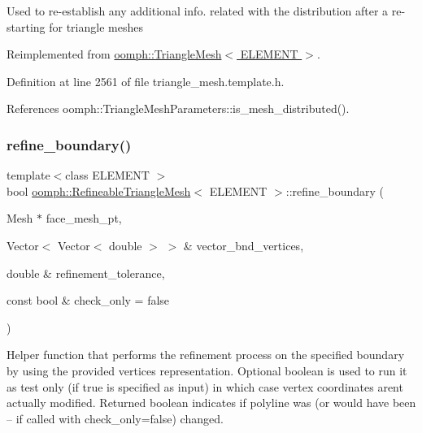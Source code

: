 Used to re-\/establish any additional info. related with the distribution after a re-\/starting for triangle meshes 

Reimplemented from \hyperlink{classoomph_1_1TriangleMesh_aa4b1cfd4537c1e511fe1f2fb14b1e8a6}{oomph\+::\+Triangle\+Mesh$<$ E\+L\+E\+M\+E\+N\+T $>$}.



Definition at line 2561 of file triangle\+\_\+mesh.\+template.\+h.



References oomph\+::\+Triangle\+Mesh\+Parameters\+::is\+\_\+mesh\+\_\+distributed().

\mbox{\label{classoomph_1_1RefineableTriangleMesh_a9bd4d46e9a61131b8b8f2b68579ac972}} 
\subsubsection{\texorpdfstring{refine\+\_\+boundary()}{refine\_boundary()}}
{\footnotesize\ttfamily template$<$class E\+L\+E\+M\+E\+NT $>$ \\
bool \hyperlink{classoomph_1_1RefineableTriangleMesh}{oomph\+::\+Refineable\+Triangle\+Mesh}$<$ E\+L\+E\+M\+E\+NT $>$\+::refine\+\_\+boundary (\begin{DoxyParamCaption}\item[{Mesh $\ast$}]{face\+\_\+mesh\+\_\+pt,  }\item[{Vector$<$ Vector$<$ double $>$ $>$ \&}]{vector\+\_\+bnd\+\_\+vertices,  }\item[{double \&}]{refinement\+\_\+tolerance,  }\item[{const bool \&}]{check\+\_\+only = {\ttfamily false} }\end{DoxyParamCaption})\hspace{0.3cm}{\ttfamily [protected]}}



Helper function that performs the refinement process on the specified boundary by using the provided vertices representation. Optional boolean is used to run it as test only (if true is specified as input) in which case vertex coordinates aren\textquotesingle{}t actually modified. Returned boolean indicates if polyline was (or would have been -- if called with check\+\_\+only=false) changed. 

